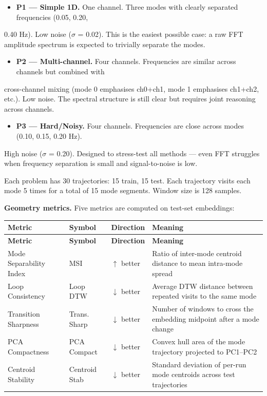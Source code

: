 \documentclass[11pt,a4paper]{article}
\begin{document}
\begin{itemize}
  \item \textbf{P1 --- Simple 1D.} One channel. Three modes with clearly separated frequencies (0.05, 0.20,
\end{itemize}
  0.40 Hz). Low noise ($\sigma$ = 0.02). This is the easiest possible case: a raw FFT amplitude spectrum
  is expected to trivially separate the modes.
\begin{itemize}
  \item \textbf{P2 --- Multi-channel.} Four channels. Frequencies are similar across channels but combined with
\end{itemize}
  cross-channel mixing (mode 0 emphasises ch0+ch1, mode 1 emphasises ch1+ch2, etc.). Low noise.
  The spectral structure is still clear but requires joint reasoning across channels.
\begin{itemize}
  \item \textbf{P3 --- Hard/Noisy.} Four channels. Frequencies are close across modes (0.10, 0.15, 0.20 Hz).
\end{itemize}
  High noise ($\sigma$ = 0.20). Designed to stress-test all methods --- even FFT struggles when frequency
  separation is small and signal-to-noise is low.

Each problem has 30 trajectories: 15 train, 15 test. Each trajectory visits each mode 5 times
for a total of 15 mode segments. Window size is 128 samples.

\textbf{Geometry metrics.} Five metrics are computed on test-set embeddings:

\begin{longtable}{|l|l|l|l|}
\hline
\textbf{Metric} & \textbf{Symbol} & \textbf{Direction} & \textbf{Meaning} \\
\hline
\endfirsthead
\hline
\textbf{Metric} & \textbf{Symbol} & \textbf{Direction} & \textbf{Meaning} \\
\hline
\endhead
\hline
\endfoot
Mode Separability Index & MSI & $\uparrow$ better & Ratio of inter-mode centroid distance to mean intra-mode spread \\
\hline
Loop Consistency & Loop DTW & $\downarrow$ better & Average DTW distance between repeated visits to the same mode \\
\hline
Transition Sharpness & Trans. Sharp & $\downarrow$ better & Number of windows to cross the embedding midpoint after a mode change \\
\hline
PCA Compactness & PCA Compact & $\downarrow$ better & Convex hull area of the mode trajectory projected to PC1--PC2 \\
\hline
Centroid Stability & Centroid Stab & $\downarrow$ better & Standard deviation of per-run mode centroids across test trajectories \\
\hline
\end{longtable}
\end{document}
